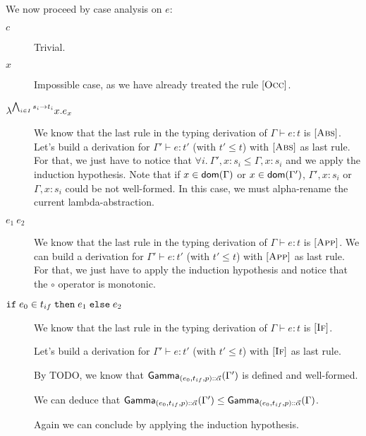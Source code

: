\documentclass[a4paper]{article}
\theoremstyle{definition}
\begin{document}
        We now proceed by case analysis on $e$:
        \begin{description}
          \item[$c$] Trivial.
          \item[$x$] Impossible case, as we have already treated the rule $[\textsc{Occ}]$.
          \item[$\lambda^{\bigwedge_{i\in I} s_i\to t_i}x.e_x$] We know that the last rule in the typing derivation of $\Gamma \vdash e:t$ is $[\textsc{Abs}]$.
          Let's build a derivation for $\Gamma' \vdash e:t'$ (with $t'\leq t$) with $[\textsc{Abs}]$ as last rule.
          For that, we just have to notice that $\forall i.\ \Gamma',x:s_i \leq \Gamma,x:s_i$ and we apply the induction hypothesis.
          Note that if $x \in \textsf{dom}(\Gamma)$ or $x \in \textsf{dom}(\Gamma')$, $\Gamma',x:s_i$ or $\Gamma,x:s_i$ could be not well-formed.
          In this case, we must alpha-rename the current lambda-abstraction.

          \item[$e_1\ e_2$] We know that the last rule in the typing derivation of $\Gamma \vdash e:t$ is $[\textsc{App}]$.
          We can build a derivation for $\Gamma' \vdash e:t'$ (with $t'\leq t$) with $[\textsc{App}]$ as last rule.
          For that, we just have to apply the induction hypothesis and notice that the $\circ$ operator is monotonic.
          \item[$\texttt{if}\;e_0\in t_{if}\;\texttt{then}\;e_1\;\texttt{else}\;e_2$]
          We know that the last rule in the typing derivation of $\Gamma \vdash e:t$ is $[\textsc{If}]$.

          Let's build a derivation for $\Gamma' \vdash e:t'$ (with $t'\leq t$) with $[\textsc{If}]$ as last rule.

          By TODO, we know that $\textsf{Gamma}_{{(e_0,t_{if},p)}\textsf{::}{\vec \alpha}}(\Gamma')$ is defined and well-formed.


          We can deduce that $\textsf{Gamma}_{{(e_0,t_{if},p)}\textsf{::}{\vec \alpha}}(\Gamma') \leq \textsf{Gamma}_{{(e_0,t_{if},p)}\textsf{::}{\vec \alpha}}(\Gamma)$.

          Again we can conclude by applying the induction hypothesis.\\
        \end{description}
    
\end{document}
